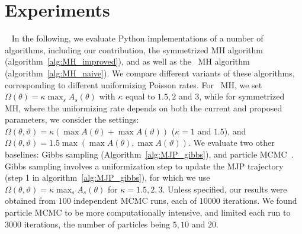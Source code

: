 \section{Experiments}\label{sec:expts}~
In the following, we evaluate Python implementations of a number of algorithms, including our contribution, the symmetrized MH algorithm (algorithm~\ref{alg:MH_improved}), and as well as the \naive\ MH algorithm (algorithm~\ref{alg:MH_naive}).
We compare different variants of these algorithms, corresponding to different uniformizing Poisson rates. %
For \naive\ MH, we set $\Omega(\theta) = \kappa \max_s A_s(\theta) $ with $\kappa$  equal to $1.5, 2$ and $3$, 
while for symmetrized MH, where the uniformizing rate depends on both the current and proposed parameters, we consider the settings:
 $\Omega(\theta, \vartheta) = \kappa (\max A(\theta) + \max A(\vartheta))$ 
 ($\kappa = 1$ and $1.5$), and 
$\Omega(\theta, \vartheta) = 1.5 \max(\max A(\theta), \max A(\vartheta))$.
We evaluate two other baselines: Gibbs sampling (Algorithm~\ref{alg:MJP_gibbs}), %
and particle MCMC~\citep[][see also section~\ref{sec:pmcmc} in the appendix]{Andrieu10}. 
Gibbs sampling involves a uniformization step to update the MJP trajectory (step 1 in algorithm~\ref{alg:MJP_gibbs}), for which we use $\Omega(\theta,\vartheta) = \kappa \max_s A_s(\theta)$ for $\kappa=1.5,2,3$. 
Unless specified, our results were obtained from $100$ independent MCMC runs, each of $10000$ iterations.
We found particle MCMC to be more computationally intensive, and limited each run to $3000$ iterations, the number of particles being $5, 10$ and $20$.%


